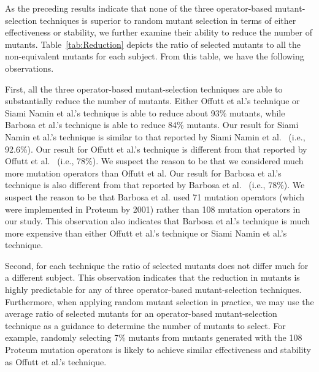 As the preceding results indicate that none of the three
operator-based mutant-selection techniques is superior to random
mutant selection in terms of either effectiveness or stability, we
further examine their ability to reduce the number of mutants.
Table~\ref{tab:Reduction} depicts the ratio of selected mutants to
all the non-equivalent mutants for each subject. From this table,
we have the following observations.

First, all the three operator-based mutant-selection techniques
are able to substantially reduce the number of mutants. Either
Offutt et al.'s technique or Siami Namin et al.'s technique is
able to reduce about 93\% mutants, while Barbosa et al.'s
technique is able to reduce 84\% mutants. Our result for Siami
Namin et al.'s technique is similar to that reported by Siami
Namin et al.~\cite{SiamiNamin:08} (i.e., 92.6\%). Our result for
Offutt et al.'s technique is different from that reported by
Offutt et al.~\cite{Offutt:96} (i.e., 78\%). We suspect the reason
to be that we considered much more mutation operators than Offutt
et al. Our result for Barbosa et al.'s technique is also different
from that reported by Barbosa et al.~\cite{Barbosa:01} (i.e.,
78\%). We suspect the reason to be that Barbosa et al. used 71
mutation operators (which were implemented in Proteum by 2001)
rather than 108 mutation operators in our study. This observation
also indicates that Barbosa et al.'s technique is much more
expensive than either Offutt et al.'s technique or Siami Namin et
al.'s technique.

Second, for each technique the ratio of selected mutants does not
differ much for a different subject. This observation indicates
that the reduction in mutants is highly predictable for any of
three operator-based mutant-selection techniques. Furthermore,
when applying random mutant selection in practice, we may use the
average ratio of selected mutants for an operator-based
mutant-selection technique as a guidance to determine the number
of mutants to select. For example, randomly selecting 7\% mutants
from mutants generated with the 108 Proteum mutation operators is
likely to achieve similar effectiveness and stability as Offutt et
al.'s technique.

